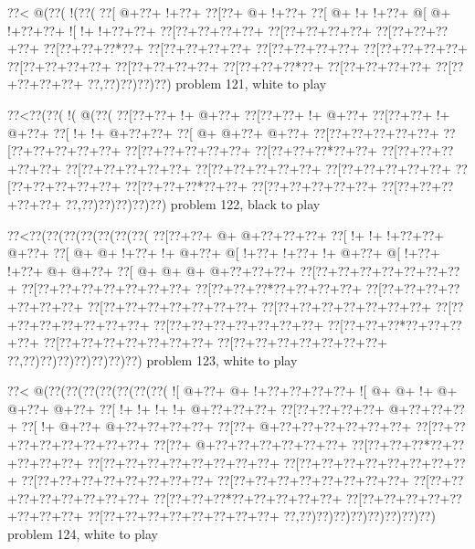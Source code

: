 \vbox{\vbox{\goo
\0??<\- @(\0??(\- !(\0??(
\0??[\- @+\0??+\- !+\0??+
\0??[\0??+\- @+\- !+\0??+
\0??[\- @+\- !+\- !+\0??+
\- @[\- @+\- !+\0??+\0??+
\- ![\- !+\- !+\0??+\0??+
\0??[\0??+\0??+\0??+\0??+
\0??[\0??+\0??+\0??+\0??+
\0??[\0??+\0??+\0??+\0??+
\0??[\0??+\0??+\0??*\0??+
\0??[\0??+\0??+\0??+\0??+
\0??[\0??+\0??+\0??+\0??+
\0??[\0??+\0??+\0??+\0??+
\0??[\0??+\0??+\0??+\0??+
\0??[\0??+\0??+\0??+\0??+
\0??[\0??+\0??+\0??*\0??+
\0??[\0??+\0??+\0??+\0??+
\0??[\0??+\0??+\0??+\0??+
\0??,\0??)\0??)\0??)\0??)
}
\hfil problem 121, white to play\hfil\break
}

\vbox{\vbox{\goo
\0??<\0??(\0??(\- !(\- @(\0??(
\0??[\0??+\0??+\- !+\- @+\0??+
\0??[\0??+\0??+\- !+\- @+\0??+
\0??[\0??+\0??+\- !+\- @+\0??+
\0??[\- !+\- !+\- @+\0??+\0??+
\0??[\- @+\- @+\0??+\- @+\0??+
\0??[\0??+\0??+\0??+\0??+\0??+
\0??[\0??+\0??+\0??+\0??+\0??+
\0??[\0??+\0??+\0??+\0??+\0??+
\0??[\0??+\0??+\0??*\0??+\0??+
\0??[\0??+\0??+\0??+\0??+\0??+
\0??[\0??+\0??+\0??+\0??+\0??+
\0??[\0??+\0??+\0??+\0??+\0??+
\0??[\0??+\0??+\0??+\0??+\0??+
\0??[\0??+\0??+\0??+\0??+\0??+
\0??[\0??+\0??+\0??*\0??+\0??+
\0??[\0??+\0??+\0??+\0??+\0??+
\0??[\0??+\0??+\0??+\0??+\0??+
\0??,\0??)\0??)\0??)\0??)\0??)
}
\hfil problem 122, black to play\hfil\break
}

\vbox{\vbox{\goo
\0??<\0??(\0??(\0??(\0??(\0??(\0??(\0??(
\0??[\0??+\0??+\- @+\- @+\0??+\0??+\0??+
\0??[\- !+\- !+\- !+\0??+\0??+\- @+\0??+
\0??[\- @+\- @+\- !+\0??+\- !+\- @+\0??+
\- @[\- !+\0??+\- !+\0??+\- !+\- @+\0??+
\- @[\- !+\0??+\- !+\0??+\- @+\- @+\0??+
\0??[\- @+\- @+\- @+\- @+\0??+\0??+\0??+
\0??[\0??+\0??+\0??+\0??+\0??+\0??+\0??+
\0??[\0??+\0??+\0??+\0??+\0??+\0??+\0??+
\0??[\0??+\0??+\0??*\0??+\0??+\0??+\0??+
\0??[\0??+\0??+\0??+\0??+\0??+\0??+\0??+
\0??[\0??+\0??+\0??+\0??+\0??+\0??+\0??+
\0??[\0??+\0??+\0??+\0??+\0??+\0??+\0??+
\0??[\0??+\0??+\0??+\0??+\0??+\0??+\0??+
\0??[\0??+\0??+\0??+\0??+\0??+\0??+\0??+
\0??[\0??+\0??+\0??*\0??+\0??+\0??+\0??+
\0??[\0??+\0??+\0??+\0??+\0??+\0??+\0??+
\0??[\0??+\0??+\0??+\0??+\0??+\0??+\0??+
\0??,\0??)\0??)\0??)\0??)\0??)\0??)\0??)
}
\hfil problem 123, white to play\hfil\break
}

\vbox{\vbox{\goo
\0??<\- @(\0??(\0??(\0??(\0??(\0??(\0??(\0??(
\- ![\- @+\0??+\- @+\- !+\0??+\0??+\0??+\0??+
\- ![\- @+\- @+\- !+\- @+\- @+\0??+\- @+\0??+
\0??[\- !+\- !+\- !+\- !+\- @+\0??+\0??+\0??+
\0??[\0??+\0??+\0??+\0??+\- @+\0??+\0??+\0??+
\0??[\- !+\- @+\0??+\- @+\0??+\0??+\0??+\0??+
\0??[\0??+\- @+\0??+\0??+\0??+\0??+\0??+\0??+
\0??[\0??+\0??+\0??+\0??+\0??+\0??+\0??+\0??+
\0??[\0??+\- @+\0??+\0??+\0??+\0??+\0??+\0??+
\0??[\0??+\0??+\0??*\0??+\0??+\0??+\0??+\0??+
\0??[\0??+\0??+\0??+\0??+\0??+\0??+\0??+\0??+
\0??[\0??+\0??+\0??+\0??+\0??+\0??+\0??+\0??+
\0??[\0??+\0??+\0??+\0??+\0??+\0??+\0??+\0??+
\0??[\0??+\0??+\0??+\0??+\0??+\0??+\0??+\0??+
\0??[\0??+\0??+\0??+\0??+\0??+\0??+\0??+\0??+
\0??[\0??+\0??+\0??*\0??+\0??+\0??+\0??+\0??+
\0??[\0??+\0??+\0??+\0??+\0??+\0??+\0??+\0??+
\0??[\0??+\0??+\0??+\0??+\0??+\0??+\0??+\0??+
\0??,\0??)\0??)\0??)\0??)\0??)\0??)\0??)\0??)
}
\hfil problem 124, white to play\hfil\break
}

